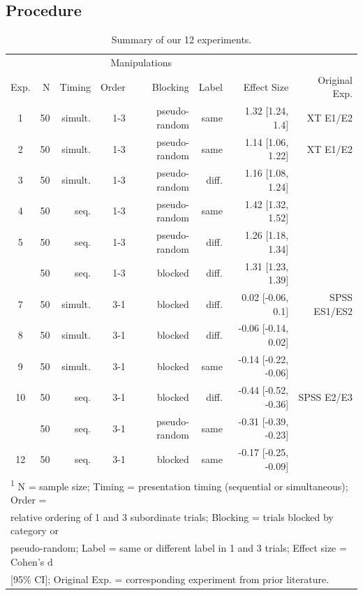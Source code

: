 \documentclass[english,floatsintext,man]{apa6}
\theoremstyle{definition}
\theoremstyle{definition}
\theoremstyle{remark}
\begin{document}
\subsection{Procedure}\label{procedure}

\begin{table}

\caption{\label{tab:unnamed-chunk-3}Summary of our 12 experiments.}
\centering
\fontsize{12}{14}\selectfont
\begin{tabular}[t]{crrrrrrr}
\toprule
\multicolumn{2}{c}{ } & \multicolumn{4}{c}{Manipulations} & \multicolumn{1}{c}{ } \\
\cmidrule(l{2pt}r{2pt}){3-6}
Exp. & N & Timing & Order & Blocking & Label & Effect Size & Original 
Exp.\\
\midrule
1 & 50 & simult. & 1-3 & pseudo-random & same & 1.32 [1.24, 1.4] & XT E1/E2\\
2 & 50 & simult. & 1-3 & pseudo-random & same & 1.14 [1.06, 1.22] & XT E1/E2\\
3 & 50 & simult. & 1-3 & pseudo-random & diff. & 1.16 [1.08, 1.24] & \\
4 & 50 & seq. & 1-3 & pseudo-random & same & 1.42 [1.32, 1.52] & \\
5 & 50 & seq. & 1-3 & pseudo-random & diff. & 1.26 [1.18, 1.34] & \\
\addlinespace
6 & 50 & seq. & 1-3 & blocked & diff. & 1.31 [1.23, 1.39] & \\
7 & 50 & simult. & 3-1 & blocked & diff. & 0.02 [-0.06, 0.1] & SPSS ES1/ES2\\
8 & 50 & simult. & 3-1 & blocked & diff. & -0.06 [-0.14, 0.02] & \\
9 & 50 & simult. & 3-1 & blocked & same & -0.14 [-0.22, -0.06] & \\
10 & 50 & seq. & 3-1 & blocked & diff. & -0.44 [-0.52, -0.36] & SPSS E2/E3\\
\addlinespace
11 & 50 & seq. & 3-1 & pseudo-random & same & -0.31 [-0.39, -0.23] & \\
12 & 50 & seq. & 3-1 & blocked & same & -0.17 [-0.25, -0.09] & \\
\bottomrule
\multicolumn{8}{l}{\textsuperscript{1} N = sample size; Timing = presentation timing (sequential or simultaneous); Order =}\\
\multicolumn{8}{l}{relative ordering of 1 and 3 subordinate trials; Blocking = trials blocked by category or}\\
\multicolumn{8}{l}{pseudo-random; Label = same or different label in 1 and 3 trials; Effect size = Cohen's d}\\
\multicolumn{8}{l}{[95\% CI]; Original Exp. = corresponding experiment from prior literature.}\\
\end{tabular}
\end{table}
\end{document}
